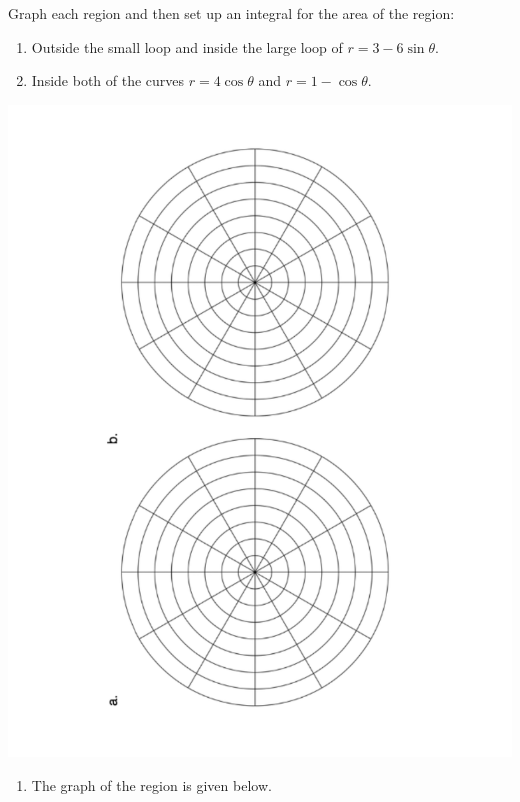 \documentclass[]{ximera}
\begin{document}
\begin{problem}
Graph each region and then set up an integral for the area of the region:
	\begin{enumerate}
	\item  Outside the small loop and inside the large loop of $r = 3 - 6 \sin \theta$.
	\item  Inside both of the curves $r = 4 \cos \theta$ and $r = 1 - \cos \theta$.
	\end{enumerate} 
	
	\begin{image}
	\includegraphics[angle=-89.99,trim= 120 220 140 220, scale=0.6]{Figure11-3-1.pdf}
	\end{image}
	
	\begin{freeResponse}
	\begin{enumerate}
	\item  The graph of the region is given below.
	

\end{enumerate}
\end{freeResponse}
\end{problem}
\end{document}
